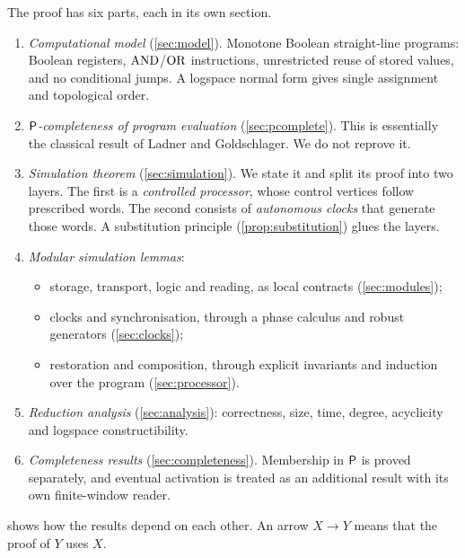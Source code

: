 The proof has six parts, each in its own section.
\begin{enumerate}[label=(\arabic*)]
\item \emph{Computational model} (\cref{sec:model}). Monotone Boolean straight-line programs:
  Boolean registers, $\operatorname{AND}$/$\operatorname{OR}$ instructions, unrestricted reuse of stored values, and no
  conditional jumps. A logspace normal form gives single assignment and topological order.
\item \emph{$\mathsf{P}$-completeness of program evaluation} (\cref{sec:pcomplete}). This is
  essentially the classical result of Ladner and Goldschlager. We do not reprove it.
\item \emph{Simulation theorem} (\cref{sec:simulation}). We state it and split its proof into
  two layers. The first is a \emph{controlled processor}, whose control vertices follow prescribed
  words. The second consists of \emph{autonomous clocks} that generate those words. A substitution
  principle (\cref{prop:substitution}) glues the layers.
\item \emph{Modular simulation lemmas}:
  \begin{itemize}
  \item storage, transport, logic and reading, as local contracts (\cref{sec:modules});
  \item clocks and synchronisation, through a phase calculus and robust generators
    (\cref{sec:clocks});
  \item restoration and composition, through explicit invariants and induction over the program
    (\cref{sec:processor}).
  \end{itemize}
\item \emph{Reduction analysis} (\cref{sec:analysis}): correctness, size, time, degree, acyclicity
  and logspace constructibility.
\item \emph{Completeness results} (\cref{sec:completeness}). Membership in $\mathsf{P}$ is proved
  separately, and eventual activation is treated as an additional result with its own
  finite-window reader.
\end{enumerate}

 shows how the results depend on each other. An arrow $X\to Y$ means that the
proof of $Y$ uses $X$.

